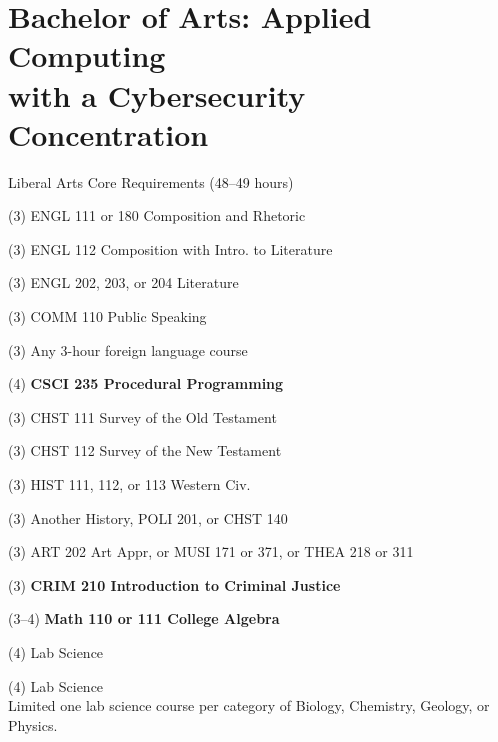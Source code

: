 %
\section*{Bachelor of Arts: Applied Computing\\with a Cybersecurity Concentration}

\begin{reqgroup}{Liberal Arts Core Requirements (48--49 hours)}
\begin{checklist}
\begin{minipage}[t]{0.5\linewidth}
	\item (3) ENGL 111 or 180 Composition and Rhetoric
	\item (3) ENGL 112 Composition with Intro\@. to Literature
	\item (3) ENGL 202, 203, or 204 Literature
	\item (3) COMM 110 Public Speaking
	\item (3) Any 3-hour foreign language course
	\item (4) \textbf{CSCI 235  Procedural Programming}
	\item (3) CHST 111  Survey of the Old Testament
	\item (3) CHST 112  Survey of the New Testament
	\item (3) HIST 111, 112, or 113 Western Civ.
\end{minipage}
\begin{minipage}[t]{0.5\linewidth}
	\item (3)	Another History, POLI 201, or CHST 140
	\item (3)	ART 202 Art Appr, or MUSI 171 or 371, or THEA 218 or 311
	\item (3)	\textbf{CRIM 210 Introduction to Criminal Justice}
	\item (3--4)	\textbf{Math 110 or 111 College Algebra}
	\item (4)	Lab Science
	\item (4)	Lab Science\\Limited one lab science course per category of Biology, Chemistry,
Geology, or Physics.
\end{minipage}
\end{checklist}
\end{reqgroup}

